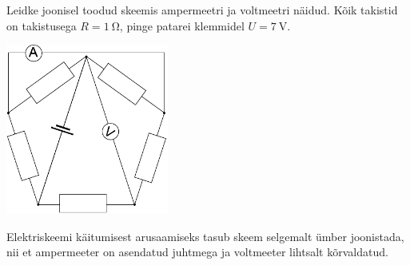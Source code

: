 
Leidke joonisel toodud skeemis ampermeetri ja voltmeetri näidud. Kõik takistid on takistusega $R=\SI{1}{\ohm}$, pinge patarei klemmidel $U=\SI{7}{\volt}$.

\begin{center}
	\includegraphics[width=0.4\textwidth]{2017-v3g-06-viisnurk}
\end{center}

\hint
Elektriskeemi käitumisest arusaamiseks tasub skeem selgemalt ümber joonistada, nii et ampermeeter on asendatud juhtmega ja voltmeeter lihtsalt kõrvaldatud.

